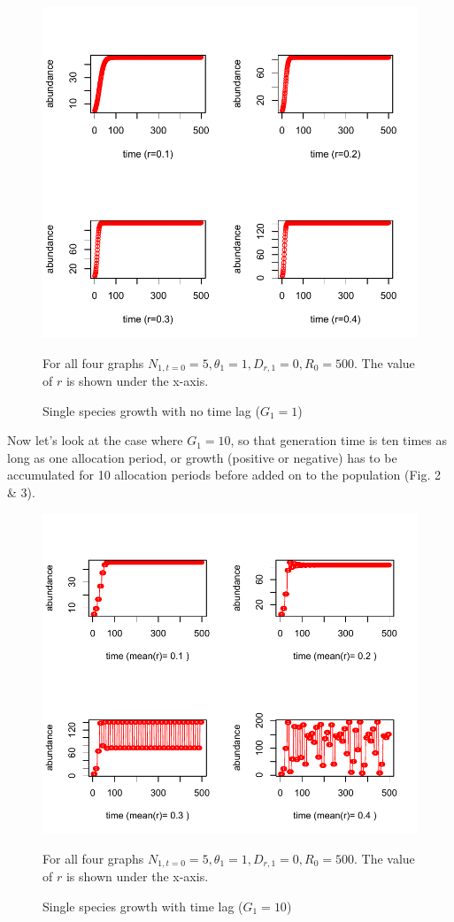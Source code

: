 \documentclass[12pt]{article}
\begin{document}
\begin{figure}
 \includegraphics[width=\textwidth]{1sp_no_sojourn.pdf}
 \caption{Single species growth with no time lag ($G_1=1$)}
For all four graphs $ N_{1,t=0}=5, \theta_1=1, D_{r,1} = 0, R_0=500$. The value of $r$ is shown under the x-axis.
\end{figure}

Now let's look at the case where $G_1=10$, so that generation time is ten times as long as one allocation period, or growth (positive or negative) has to be accumulated for 10 allocation periods before added on to the population (Fig. 2 \& 3).

\begin{figure}
 \includegraphics[width=\textwidth]{1sp_sojourn.pdf}
 \caption{Single species growth with time lag ($G_1=10$)}
For all four graphs $ N_{1,t=0}=5, \theta_1=1, D_{r,1} = 0, R_0=500$. The value of $r$ is shown under the x-axis.
\end{figure}
\end{document}
